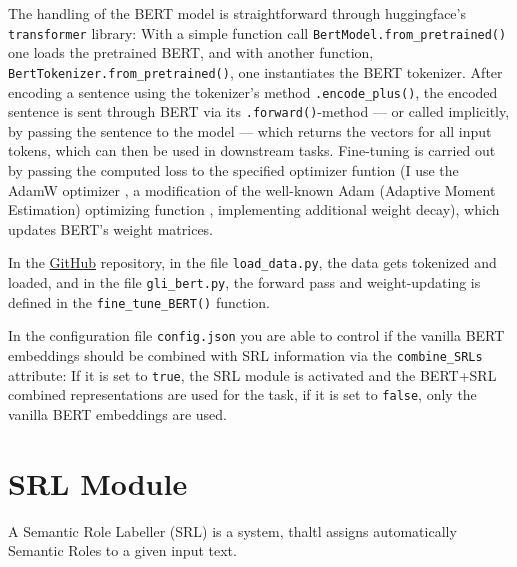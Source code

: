 The handling of the BERT model is straightforward through huggingface's \texttt{transformer}
library: With a simple function call \texttt{BertModel.from\_pretrained()} one loads the
pretrained BERT, and with another function, \texttt{BertTokenizer.from\_pretrained()},
one instantiates the BERT tokenizer.
After encoding a sentence using the tokenizer's method \texttt{.encode\_plus()}, the
encoded sentence is sent through BERT via its \texttt{.forward()}-method --- or
called implicitly, by passing the sentence to the model --- which returns the
vectors for all input tokens, which can then be used in downstream tasks. Fine-tuning
is carried out by passing the computed loss to the specified optimizer funtion (I use the
AdamW optimizer \citep{loshchilov2019decoupled}, a modification of the well-known
Adam (Adaptive Moment Estimation) optimizing function \citep{kingma2014adam}, implementing
additional weight decay), which updates BERT's weight matrices.

In the \href{https://github.com/JonathanSchaber/Masterarbeit}{GitHub} repository, in
the file \texttt{load\_data.py}, the data gets tokenized and loaded, and in
the file \texttt{gli\_bert.py}, the forward pass and weight-updating is
defined in the \texttt{fine\_tune\_BERT()} function.

\begin{tcolorbox}[
  colback=blue!5!white,
  colframe=blue!75!black,
  title={\centering Code}]

  In the configuration file \texttt{config.json} you are able to control if the vanilla BERT
  embeddings should be combined with SRL information via the \texttt{combine\_SRLs} attribute:
  If it is set to \texttt{true}, the SRL module is activated and the BERT+SRL combined
  representations are used for the task, if it is set to \texttt{false}, only the vanilla
  BERT embeddings are used.

\end{tcolorbox}




\section{SRL Module}
\label{sec:srl-module}

A Semantic Role Labeller (SRL) is a system, thaltl assigns automatically Semantic Roles to a
given input text.

